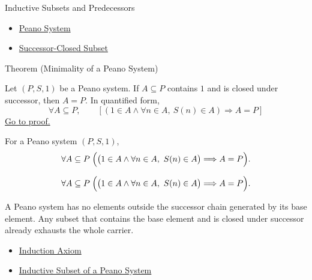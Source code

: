 \begin{topicbox}{Inductive Subsets and Predecessors}
\begin{dependencies}
\begin{itemize}
  \item \hyperref[def:peano-system]{Peano System}
  \item \hyperref[def:successor-closed-subset]{Successor-Closed Subset}
\end{itemize}
\end{dependencies}

\begin{theorembox}{Theorem (Minimality of a Peano System)}
\begin{theorem}
\label{thm:peano-minimality}
Let $(P,S,1)$ be a Peano system. If $A\subseteq P$ contains $1$ and is closed
under successor, then $A=P$. In quantified form,
\[
\forall A\subseteq P,\qquad
\left[
\left(1\in A \land
\forall n\in A,\ S(n)\in A\right)
\Longrightarrow A=P
\right]
\]
\hyperref[prf:peano-minimality]{Go to proof.}
\end{theorem}
\end{theorembox}

\begin{remark*}
For a Peano system $(P,S,1)$,
\[
\forall A\subseteq P\;
\Bigl(\bigl(1\in A \land
\forall n\in A,\ S(n)\in A\bigr)
\Longrightarrow A=P\Bigr).
\]
\end{remark*}

\begin{remark*}
\[
\forall A\subseteq P\;
\Bigl(\bigl(1\in A \land
\forall n\in A,\ S(n)\in A\bigr)
\Longrightarrow A=P\Bigr).
\]
\end{remark*}

\begin{remark*}[Interpretation]
A Peano system has no elements outside the successor chain generated by its
base element. Any subset that contains the base element and is closed under
successor already exhausts the whole carrier.
\end{remark*}

\begin{dependencies}
\begin{itemize}
  \item \hyperref[ax:peano-induction]{Induction Axiom}
  \item \hyperref[def:inductive-subset-of-peano-system]{Inductive Subset of a Peano System}
\end{itemize}
\end{dependencies}


\end{topicbox}
